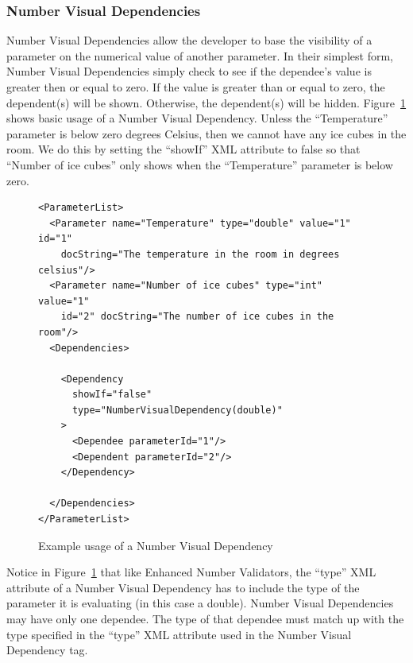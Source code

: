 \subsubsection{Number Visual Dependencies}
Number Visual Dependencies allow the developer to base the visibility of a parameter on the numerical value of another parameter. In their simplest form,
Number Visual Dependencies simply check to see if the dependee's value is greater then or equal to zero. If the value is greater than or equal to zero, the
dependent(s) will be shown. Otherwise, the dependent(s) will be hidden.
Figure~\ref{NumberVisXML1} shows basic usage of a Number Visual Dependency. Unless the ``Temperature'' parameter is below zero degrees
Celsius, then we cannot have any ice cubes in the room. We do this by setting the ``showIf'' XML attribute to false so that ``Number of ice cubes'' only shows
when the ``Temperature'' parameter is below zero.
\begin{figure}
\centering
{\footnotesize
\begin{Verbatim}
<ParameterList>
  <Parameter name="Temperature" type="double" value="1" id="1" 
    docString="The temperature in the room in degrees celsius"/>
  <Parameter name="Number of ice cubes" type="int" value="1"
    id="2" docString="The number of ice cubes in the room"/>
  <Dependencies>

    <Dependency 
      showIf="false" 
      type="NumberVisualDependency(double)"
    >
      <Dependee parameterId="1"/>
      <Dependent parameterId="2"/>
    </Dependency>

  </Dependencies>
</ParameterList>
\end{Verbatim}
}
\caption{Example usage of a Number Visual Dependency}
\label{NumberVisXML1}
\end{figure}

Notice in Figure~\ref{NumberVisXML1} that like Enhanced Number Validators, the ``type'' XML attribute of a Number Visual Dependency has to include the 
type of the parameter it is evaluating (in this case a double). Number Visual Dependencies may have only one dependee. The type of that dependee 
must match up with the type specified in the ``type'' XML attribute used in the Number Visual Dependency tag.

